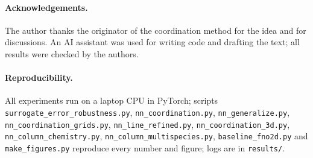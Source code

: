 \documentclass[11pt]{article}
\begin{document}
\paragraph{Acknowledgements.}
The author thanks the originator of the coordination method for the idea and for discussions.
An AI assistant was used for writing code and drafting the text; all results were checked by the authors.

\paragraph{Reproducibility.}
All experiments run on a laptop CPU in PyTorch; scripts \texttt{surrogate\_error\_robustness.py},
\texttt{nn\_coordination.py}, \texttt{nn\_generalize.py}, \texttt{nn\_coordination\_grids.py}, \texttt{nn\_line\_refined.py},
\texttt{nn\_coordination\_3d.py}, \texttt{nn\_column\_chemistry.py}, \texttt{nn\_column\_multispecies.py}, \texttt{baseline\_fno2d.py} and
\texttt{make\_figures.py} reproduce every number and figure; logs are in \texttt{results/}.



\end{document}
